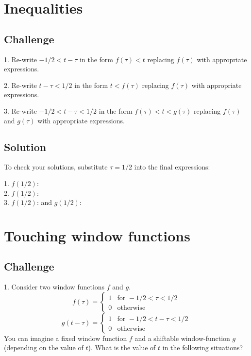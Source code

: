 \timebox




\newpage
\section{Inequalities}

\subsection*{Challenge}
1. Re-write $-1/2 < t - \tau$ in the form $f(\tau) < t$ replacing $f(\tau)$ with appropriate expressions.

2. Re-write $t - \tau < 1/2$ in the form $t < f(\tau)$ replacing $f(\tau)$ with appropriate expressions.

3. Re-write $-1/2 < t - \tau < 1/2$ in the form $f(\tau) < t < g(\tau)$ replacing $f(\tau)$ and $g(\tau)$ with appropriate expressions.

\subsection*{Solution}
To check your solutions, substitute $\tau=1/2$ into the final expressions:

1. $f(1/2)$: \\
2. $f(1/2)$: \\
3. $f(1/2)$:  and $g(1/2)$: 

\timebox




\newpage
\section{Touching window functions}
\label{sec:touchingwindows}

\subsection*{Challenge}
1. Consider two window functions $f$ and $g$.
\begin{equation}
    f(\tau)=
    \begin{cases}
        1 & \text{for } -1/2 < \tau < 1/2\\
        0 & \text{otherwise}
    \end{cases}
\end{equation}
\begin{equation}
    g(t-\tau)=
    \begin{cases}
        1 & \text{for } -1/2 < t-\tau < 1/2\\
        0 & \text{otherwise}
    \end{cases}
\end{equation}
You can imagine a fixed window function $f$ and a shiftable window-function $g$ (depending on the value of $t$). What is the value of $t$ in the following situations?

